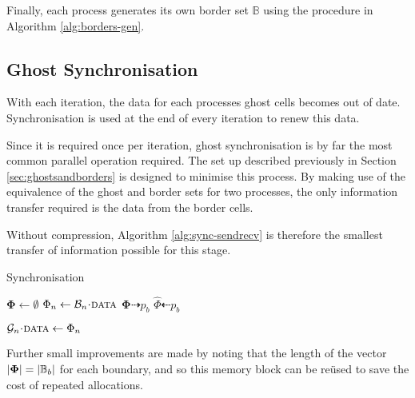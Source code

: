 \documentclass{IIBproject}
\newcommand{\vect} [1] {\bm{#1}}
\newcommand{\dra}{\dashrightarrow}
\newcommand{\dla}{\dashleftarrow}
\newcommand{\acc}{{\mkern 0.5mu\cdot\mkern 0.5mu}}
\numberwithin{figure}{section}
\begin{document}
        Finally, each process generates its own border set $\mathbb{B}$ using the procedure in Algorithm \ref{alg:borders-gen}.



    \subsection{Ghost Synchronisation} %
        \label{sec:ghostsync}

        With each iteration, the data for each processes ghost cells becomes out of date. Synchronisation is used at the end of every iteration to renew this data.

        Since it is required once per iteration, ghost synchronisation is by far the most common parallel operation required. The set up described previously in Section \ref{sec:ghostsandborders} is designed to minimise this process. By making use of the equivalence of the ghost and border sets for two processes, the only information transfer required is the data from the border cells.

        Without compression, Algorithm \ref{alg:sync-sendrecv} is therefore the smallest transfer of information possible for this stage.

        \begin{algorithm}[H]
            \caption{Synchronisation}
            \label{alg:sync-sendrecv}

            \begin{algorithmic}
                    \State $\vect{\Phi} \gets \emptyset$
                        \State $\Phi_n \gets \mathcal{B}_n\acc\textproc{data}$
                    \EndFor
                    \Send $\vect{\Phi} \dra p_b$
                \EndFor
                \Statex
                    \Recv $\hat \Phi \dla p_b$

                        \State $\mathcal{G}_n\acc\textproc{data} \gets \Phi_n$
                    \EndFor
                \EndFor
            \end{algorithmic}
        \end{algorithm}

        Further small improvements are made by noting that the length of the vector $\abs{\vect{\Phi}} = \abs{\mathbb{B}_b}$ for each boundary, and so this memory block can be re\"used to save the cost of repeated allocations.
\end{document}
